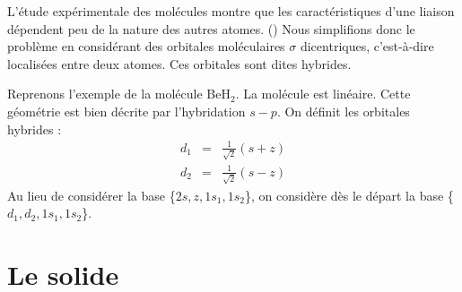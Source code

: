 \documentclass[12pt]{book}
\begin{document}
L'\'etude exp\'erimentale des mol\'ecules montre que les
caract\'eristiques d'une liaison d\'ependent peu de la nature des autres
atomes. (\cite{ph:chimi:Didier}) Nous simplifions donc le probl\`eme en
consid\'erant des orbitales mol\'eculaires $\sigma$ dicentriques,
c'est-\`a-dire localis\'ees entre deux atomes. Ces orbitales sont
dites hybrides.
\begin{exmp}
Reprenons l'exemple de la mol\'ecule BeH$_2$. La mol\'ecule est
lin\'eaire. Cette g\'eom\'etrie est bien d\'ecrite par l'hybridation
$s-p$. On d\'efinit les orbitales hybrides :
\begin{eqnarray}
d_1&=&\frac{1}{\sqrt{2}}(s+z)\\
d_2&=&\frac{1}{\sqrt{2}}(s-z)
\end{eqnarray}
Au lieu de consid\'erer la base \{$2s,z,1s_1,1s_2$\}, on consid\`ere
d\`es le d\'epart la base
\{$d_1,d_2,1s_1,1s_2$\}.
\end {exmp}
\section{Le solide}\label{secsolidmq}
\end{document}
